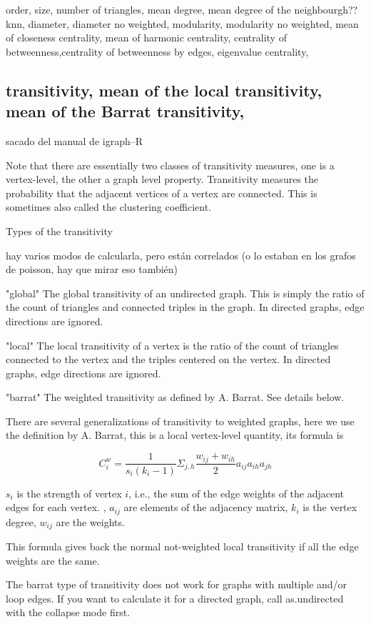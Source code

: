 \documentclass{article}
\begin{document}
order, size, number of triangles, 
mean degree, mean degree of the neighbourgh?? knn, 
diameter, diameter no weighted,
modularity, modularity no weighted,
mean of closeness centrality, mean of harmonic centrality, 
centrality of betweenness,centrality of betweenness by edges,
eigenvalue centrality, 

\subsection{transitivity, mean of the local transitivity, mean of the Barrat transitivity,}

sacado del manual de igraph--R


Note that there are essentially two classes of transitivity measures, one is a vertex-level, the other a graph level property. Transitivity measures the probability that the adjacent vertices of a vertex are connected. This is sometimes also called the clustering coefficient.

Types of the transitivity  

hay varios modos de calcularla, pero están correlados (o lo estaban en los grafos de poisson, hay que mirar eso también)

"global" The global transitivity of an undirected graph. This is simply the ratio of the count of triangles and connected triples in the graph. In directed graphs, edge directions are ignored.

"local" The local transitivity of a vertex is the ratio of the count of triangles connected to the vertex and the triples centered on the vertex. In directed graphs, edge directions are ignored.

"barrat" The weighted transitivity as defined by A. Barrat. See details below.


There are several generalizations of transitivity to weighted graphs, here we use the definition by A. Barrat, this is a local vertex-level quantity, its formula is

$$
C_i^w=\dfrac{1}{s_i(k_i-1)}
\Sigma_{j,h}\dfrac{w_{ij}+w_{ih}}{2}a_{ij}a_{ih}a_{jh}
$$

$s_i$ is the strength of vertex $i$, i.e., the sum of the edge weights of the adjacent edges for each vertex. , $a_{ij}$ are elements of the adjacency matrix, $k_i$ is the vertex degree, $w_{ij}$ are the weights.

This formula gives back the normal not-weighted local transitivity if all the edge weights are the same.

The barrat type of transitivity does not work for graphs with multiple and/or loop edges. If you want to calculate it for a directed graph, call as.undirected with the collapse mode first.
\end{document}
